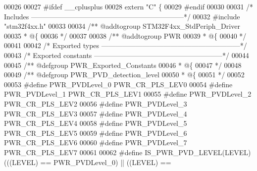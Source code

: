 \begin{DoxyCode}
00026 
00027 \textcolor{preprocessor}{#}\textcolor{preprocessor}{ifdef} \_\_cplusplus
00028  \textcolor{keyword}{extern} \textcolor{stringliteral}{"C"} \{
00029 \textcolor{preprocessor}{#}\textcolor{preprocessor}{endif}
00030 
00031 \textcolor{comment}{/* Includes ------------------------------------------------------------------*/}
00032 \textcolor{preprocessor}{#}\textcolor{preprocessor}{include} "stm32f4xx.h"
00033 
00034 \textcolor{comment}{/** @addtogroup STM32F4xx\_StdPeriph\_Driver}
00035 \textcolor{comment}{  * @\{}
00036 \textcolor{comment}{  */}
00037 
00038 \textcolor{comment}{/** @addtogroup PWR}
00039 \textcolor{comment}{  * @\{}
00040 \textcolor{comment}{  */}
00041 
00042 \textcolor{comment}{/* Exported types ------------------------------------------------------------*/}
00043 \textcolor{comment}{/* Exported constants --------------------------------------------------------*/}
00044 
00045 \textcolor{comment}{/** @defgroup PWR\_Exported\_Constants}
00046 \textcolor{comment}{  * @\{}
00047 \textcolor{comment}{  */}
00048 
00049 \textcolor{comment}{/** @defgroup PWR\_PVD\_detection\_level }
00050 \textcolor{comment}{  * @\{}
00051 \textcolor{comment}{  */}
00052 
00053 \textcolor{preprocessor}{#}\textcolor{preprocessor}{define} \textcolor{preprocessor}{PWR\_PVDLevel\_0}                  PWR_CR_PLS_LEV0
00054 \textcolor{preprocessor}{#}\textcolor{preprocessor}{define} \textcolor{preprocessor}{PWR\_PVDLevel\_1}                  PWR_CR_PLS_LEV1
00055 \textcolor{preprocessor}{#}\textcolor{preprocessor}{define} \textcolor{preprocessor}{PWR\_PVDLevel\_2}                  PWR_CR_PLS_LEV2
00056 \textcolor{preprocessor}{#}\textcolor{preprocessor}{define} \textcolor{preprocessor}{PWR\_PVDLevel\_3}                  PWR_CR_PLS_LEV3
00057 \textcolor{preprocessor}{#}\textcolor{preprocessor}{define} \textcolor{preprocessor}{PWR\_PVDLevel\_4}                  PWR_CR_PLS_LEV4
00058 \textcolor{preprocessor}{#}\textcolor{preprocessor}{define} \textcolor{preprocessor}{PWR\_PVDLevel\_5}                  PWR_CR_PLS_LEV5
00059 \textcolor{preprocessor}{#}\textcolor{preprocessor}{define} \textcolor{preprocessor}{PWR\_PVDLevel\_6}                  PWR_CR_PLS_LEV6
00060 \textcolor{preprocessor}{#}\textcolor{preprocessor}{define} \textcolor{preprocessor}{PWR\_PVDLevel\_7}                  PWR_CR_PLS_LEV7
00061 
00062 \textcolor{preprocessor}{#}\textcolor{preprocessor}{define} \textcolor{preprocessor}{IS\_PWR\_PVD\_LEVEL}\textcolor{preprocessor}{(}\textcolor{preprocessor}{LEVEL}\textcolor{preprocessor}{)} \textcolor{preprocessor}{(}\textcolor{preprocessor}{(}\textcolor{preprocessor}{(}\textcolor{preprocessor}{LEVEL}\textcolor{preprocessor}{)} \textcolor{preprocessor}{==} PWR_PVDLevel_0\textcolor{preprocessor}{)} \textcolor{preprocessor}{||} \textcolor{preprocessor}{(}\textcolor{preprocessor}{(}\textcolor{preprocessor}{LEVEL}\textcolor{preprocessor}{)} \textcolor{preprocessor}{==} 

\end{DoxyCode}
